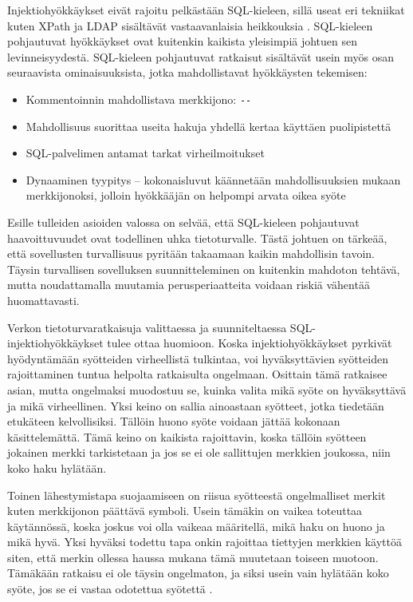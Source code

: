 Injektiohyökkäykset eivät rajoitu pelkästään SQL-kieleen, sillä useat eri tekniikat kuten XPath ja LDAP sisältävät vastaavanlaisia 
heikkouksia \cite{WEB2}. SQL-kieleen pohjautuvat hyökkäykset ovat kuitenkin kaikista yleisimpiä johtuen sen levinneisyydestä. SQL-kieleen
pohjautuvat ratkaisut sisältävät usein myös osan seuraavista ominaisuuksista, jotka mahdollistavat hyökkäysten tekemisen:

\begin{itemize}
\item Kommentoinnin mahdollistava merkkijono: \texttt{{-}{-}}
\item Mahdollisuus suorittaa useita hakuja yhdellä kertaa käyttäen puolipistettä
\item SQL-palvelimen antamat tarkat virheilmoitukset
\item Dynaaminen tyypitys -- kokonaisluvut käännetään mahdollisuuksien mukaan merkkijonoksi, jolloin hyökkääjän
             on helpompi arvata oikea syöte \cite{SQLSS}
\end{itemize}

Esille tulleiden asioiden valossa on selvää, että SQL-kieleen pohjautuvat haavoittuvuudet ovat todellinen uhka tietoturvalle.
Tästä johtuen on tärkeää, että sovellusten turvallisuus pyritään takaamaan kaikin mahdollisin tavoin. Täysin turvallisen sovelluksen 
suunnitteleminen on kuitenkin mahdoton tehtävä, mutta noudattamalla muutamia perusperiaatteita voidaan riskiä vähentää huomattavasti.

Verkon tietoturvaratkaisuja valittaessa ja suunniteltaessa
SQL-\-injektiohyökkäykset tulee ottaa huomioon.
Koska injektiohyökkäykset pyrkivät hyödyntämään syötteiden
virheellistä tulkintaa, voi hyväksyttävien syötteiden rajoittaminen
tuntua helpolta ratkaisulta ongelmaan. Osittain tämä ratkaisee asian,
mutta ongelmaksi muodostuu se, kuinka valita mikä syöte on
hyväksyttävä ja mikä virheellinen. Yksi keino on sallia ainoastaan
syötteet, jotka tiedetään etukäteen kelvollisiksi. Tällöin huono syöte
voidaan jättää kokonaan käsittelemättä. Tämä keino on kaikista
rajoittavin, koska tällöin syötteen jokainen merkki tarkistetaan ja
jos se ei ole sallittujen merkkien joukossa, niin koko haku
hylätään.

Toinen lähestymistapa suojaamiseen on riisua syötteestä ongelmalliset
merkit kuten merkkijonon päättävä symboli. Usein tämäkin on vaikea
toteuttaa käytännössä, koska joskus voi olla vaikeaa määritellä, mikä
haku on huono ja mikä hyvä. Yksi hyväksi todettu tapa onkin rajoittaa
tiettyjen merkkien käyttöä siten, että merkin ollessa haussa mukana
tämä muutetaan toiseen muotoon. Tämäkään ratkaisu ei ole täysin
ongelmaton, ja siksi usein vain hylätään koko syöte, jos se ei vastaa
odotettua syötettä \cite{SQLSS}.

